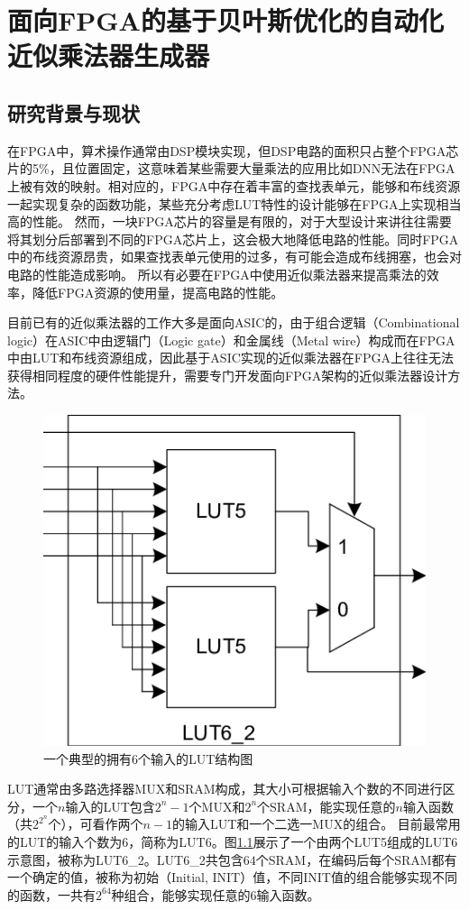 \chapter{面向FPGA的基于贝叶斯优化的自动化近似乘法器生成器}


\section{研究背景与现状}

在FPGA中，算术操作通常由DSP模块实现，但DSP电路的面积只占整个FPGA芯片的5\%，且位置固定\cite{FPGA:DSP}，这意味着某些需要大量乘法的应用比如DNN无法在FPGA上被有效的映射\cite{FPGA:Math}。相对应的，FPGA中存在着丰富的查找表单元，能够和布线资源一起实现复杂的函数功能，某些充分考虑LUT特性的设计能够在FPGA上实现相当高的性能\cite{FPGA:PolyLUT}。
然而，一块FPGA芯片的容量是有限的，对于大型设计来讲往往需要将其划分后部署到不同的FPGA芯片上，这会极大地降低电路的性能。同时FPGA中的布线资源昂贵，如果查找表单元使用的过多，有可能会造成布线拥塞，也会对电路的性能造成影响。
所以有必要在FPGA中使用近似乘法器来提高乘法的效率，降低FPGA资源的使用量，提高电路的性能。

目前已有的近似乘法器的工作大多是面向ASIC的\cite{AC:AM:KMap,AC:AM:DRUM,AC:AM:SDLC,AC:AM:Adapt,AC:AM:CGP_Evoapprox8b,AC:AM:OU,AC:AM:CR,AC:AM:AC}，由于组合逻辑（Combinational logic）在ASIC中由逻辑门（Logic gate）和金属线（Metal wire）构成而在FPGA中由LUT和布线资源组成，因此基于ASIC实现的近似乘法器在FPGA上往往无法获得相同程度的硬件性能提升，需要专门开发面向FPGA架构的近似乘法器设计方法。

\begin{figure}[!h]
    \centering
    \includegraphics[width=0.5\linewidth]{figs/FPGA-LUT6_2.png}
    \caption{一个典型的拥有6个输入的LUT结构图}
    \label{FPGA:Fig:LUT6_2}
\end{figure}

LUT通常由多路选择器MUX和SRAM构成，其大小可根据输入个数的不同进行区分，一个$n$输入的LUT包含$2^n -1$个MUX和$2^n$个SRAM，能实现任意的$n$输入函数（共$2^{2^n}$个），可看作两个$n-1$的输入LUT和一个二选一MUX的组合。
目前最常用的LUT的输入个数为6\cite{FPGA:VIB}，简称为LUT6。图\ref{FPGA:Fig:LUT6_2}展示了一个由两个LUT5组成的LUT6示意图，被称为LUT6\_2。LUT6\_2共包含$64$个SRAM，在编码后每个SRAM都有一个确定的值，被称为初始（Initial, INIT）值，不同INIT值的组合能够实现不同的函数，一共有$2^{64}$种组合，能够实现任意的6输入函数。

